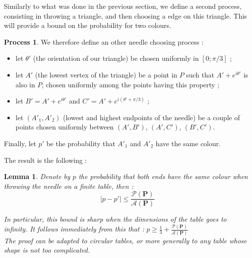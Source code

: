 \documentclass[a4paper,11pt]{article}
\newtheorem{lemma}{Lemma}
\theoremstyle{definition}
\newtheorem{process}{Process}
\theoremstyle{remark}
\begin{document}
Similarly to what was done in the previous section, we define a second process, consisting in throwing a triangle, and then choosing a edge on this triangle.
This will provide a bound on the probability for two colours.

\begin{process}
We therefore define an other needle choosing process :
\begin{itemize}
  \item let $\theta '$ (the orientation of our triangle) be chosen uniformly in $[0;\pi / 3]$ ;
  \item let $A'$ (the lowest vertex of the triangle) be a point in $P$ such that $A' + e^{i\theta '}$ is also in $P$, chosen uniformly among the points having this property ;
  \item let $B' = A' + e^{i \theta '}$ and $C' = A' + e^{i (\theta ' + \pi / 3 ) }$ ;
  \item let $(A'_1,A'_2)$ (lowest and highest endpoints of the needle) be a couple of points chosen uniformly between $(A',B')$, $(A',C')$, $(B',C')$.
\end{itemize}
Finally, let $p'$ be the probability that $A'_1$ and $A'_2$ have the same colour.
\end{process}


The result is the following :
\begin{lemma}
Denote by $p$ the probability that both ends have the same colour when throwing the needle on a finite table, then :
 $$ | p - p'| \leq \frac{\mathcal{P}(\mathbf{P})}{\mathcal{A}(\mathbf{P})} $$

In particular, this bound is sharp when the dimensions of the table goes to infinity. It follows immediately from this that : $p \geq \frac13 + \frac{\mathcal{P}(\mathbf{P})}{\mathcal{A}(\mathbf{P})}$ \\
The proof can be adapted to circular tables, or more generally to any table whose shape is not too complicated. \\
\end{lemma}
\end{document}
